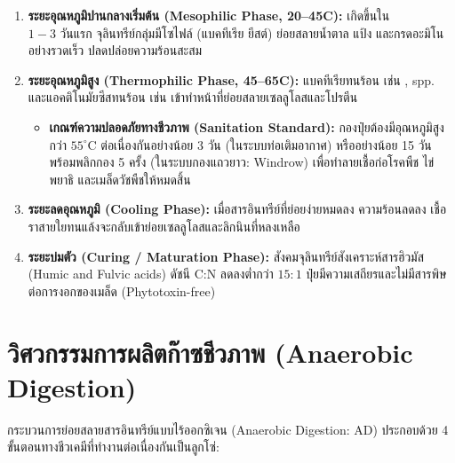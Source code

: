 \begin{enumerate}
    \item \textbf{ระยะอุณหภูมิปานกลางเริ่มต้น (Mesophilic Phase, 20--45\degree C):} เกิดขึ้นใน $1 - 3\text{ วันแรก}$ จุลินทรีย์กลุ่มมีโซไฟล์ (แบคทีเรีย ยีสต์) ย่อยสลายน้ำตาล แป้ง และกรดอะมิโนอย่างรวดเร็ว ปลดปล่อยความร้อนสะสม
    \item \textbf{ระยะอุณหภูมิสูง (Thermophilic Phase, 45--65\degree C):} แบคทีเรียทนร้อน เช่น ,  spp. และแอคติโนมัยซีสทนร้อน เช่น  เข้าทำหน้าที่ย่อยสลายเซลลูโลสและโปรตีน 
    \begin{itemize}
        \item \textbf{เกณฑ์ความปลอดภัยทางชีวภาพ (Sanitation Standard):} กองปุ๋ยต้องมีอุณหภูมิสูงกว่า $55^\circ\text{C}$ ต่อเนื่องกันอย่างน้อย 3 วัน (ในระบบท่อเติมอากาศ) หรืออย่างน้อย 15 วันพร้อมพลิกกอง 5 ครั้ง (ในระบบกองแถวยาว: Windrow) เพื่อทำลายเชื้อก่อโรคพืช ไข่พยาธิ และเมล็ดวัชพืชให้หมดสิ้น
    \end{itemize}
    \item \textbf{ระยะลดอุณหภูมิ (Cooling Phase):} เมื่อสารอินทรีย์ที่ย่อยง่ายหมดลง ความร้อนลดลง เชื้อราสายใยทนแล้งจะกลับเข้าย่อยเซลลูโลสและลิกนินที่หลงเหลือ
    \item \textbf{ระยะบ่มตัว (Curing / Maturation Phase):} สังคมจุลินทรีย์สังเคราะห์สารฮิวมัส (Humic and Fulvic acids) ดัชนี C:N ลดลงต่ำกว่า $15:1$ ปุ๋ยมีความเสถียรและไม่มีสารพิษต่อการงอกของเมล็ด (Phytotoxin-free)
\end{enumerate}

\section{วิศวกรรมการผลิตก๊าซชีวภาพ (Anaerobic Digestion)}

กระบวนการย่อยสลายสารอินทรีย์แบบไร้ออกซิเจน (Anaerobic Digestion: AD) ประกอบด้วย 4 ขั้นตอนทางชีวเคมีที่ทำงานต่อเนื่องกันเป็นลูกโซ่:

